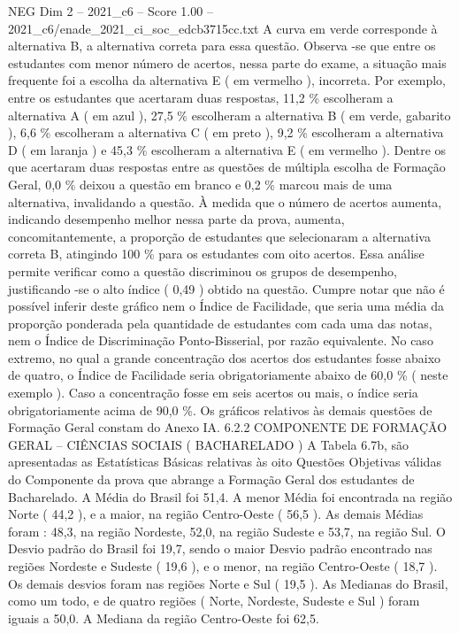 \begin{textsample}{NEG Dim 2 – 2021\_c6 – Score 1.00 – 2021\_c6/enade\_2021\_ci\_soc\_edcb3715cc.txt}
A curva em verde corresponde à alternativa B, a alternativa correta para essa questão.
Observa -se que entre os estudantes com menor número de acertos, nessa parte do exame, a situação mais frequente foi a escolha da alternativa E ( em vermelho ), incorreta.
Por exemplo, entre os estudantes que acertaram duas respostas, 11,2 \% escolheram a alternativa A ( em azul ), 27,5 \% escolheram a alternativa B ( em verde, gabarito ), 6,6 \% escolheram a alternativa C ( em preto ), 9,2 \% escolheram a alternativa D ( em laranja ) e 45,3 \% escolheram a alternativa E ( em vermelho ).
Dentre os que acertaram duas respostas entre as questões de múltipla escolha de Formação Geral, 0,0 \% deixou a questão em branco e 0,2 \% marcou mais de uma alternativa, invalidando a questão.
À medida que o número de acertos aumenta, indicando desempenho melhor nessa parte da prova, aumenta, concomitantemente, a proporção de estudantes que selecionaram a alternativa correta B, atingindo 100 \% para os estudantes com oito acertos.
Essa análise permite verificar como a questão discriminou os grupos de desempenho, justificando -se o alto índice ( 0,49 ) obtido na questão.
Cumpre notar que não é possível inferir deste gráfico nem o Índice de Facilidade, que seria uma média da proporção ponderada pela quantidade de estudantes com cada uma das notas, nem o Índice de Discriminação Ponto-Bisserial, por razão equivalente.
No caso extremo, no qual a grande concentração dos acertos dos estudantes fosse abaixo de quatro, o Índice de Facilidade seria obrigatoriamente abaixo de 60,0 \% ( neste exemplo ).
Caso a concentração fosse em seis acertos ou mais, o índice seria obrigatoriamente acima de 90,0 \%.
Os gráficos relativos às demais questões de Formação Geral constam do Anexo IA. 6.2.2 COMPONENTE DE FORMAÇÃO GERAL – CIÊNCIAS SOCIAIS ( BACHARELADO ) A Tabela 6.7b, são apresentadas as Estatísticas Básicas relativas às oito Questões Objetivas válidas do Componente da prova que abrange a Formação Geral dos estudantes de Bacharelado.
A Média do Brasil foi 51,4.
A menor Média foi encontrada na região Norte ( 44,2 ), e a maior, na região Centro-Oeste ( 56,5 ).
As demais Médias foram : 48,3, na região Nordeste, 52,0, na região Sudeste e 53,7, na região Sul.
O Desvio padrão do Brasil foi 19,7, sendo o maior Desvio padrão encontrado nas regiões Nordeste e Sudeste ( 19,6 ), e o menor, na região Centro-Oeste ( 18,7 ).
Os demais desvios foram nas regiões Norte e Sul ( 19,5 ).
As Medianas do Brasil, como um todo, e de quatro regiões ( Norte, Nordeste, Sudeste e Sul ) foram iguais a 50,0.
A Mediana da região Centro-Oeste foi 62,5.

\end{textsample}
